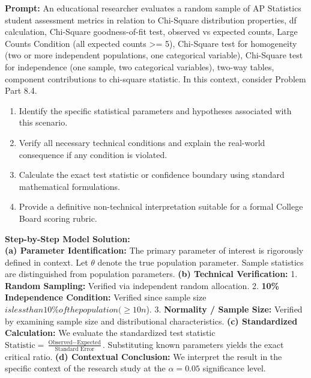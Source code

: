 \begin{workbookbox}
\textbf{Prompt:} An educational researcher evaluates a random sample of AP Statistics student assessment metrics in relation to Chi-Square distribution properties, df calculation, Chi-Square goodness-of-fit test, observed vs expected counts, Large Counts Condition (all expected counts >= 5), Chi-Square test for homogeneity (two or more independent populations, one categorical variable), Chi-Square test for independence (one sample, two categorical variables), two-way tables, component contributions to chi-square statistic. In this context, consider Problem Part 8.4.
\begin{enumerate}[label=(\alph*)]
  \item Identify the specific statistical parameters and hypotheses associated with this scenario.
  \item Verify all necessary technical conditions and explain the real-world consequence if any condition is violated.
  \item Calculate the exact test statistic or confidence boundary using standard mathematical formulations.
  \item Provide a definitive non-technical interpretation suitable for a formal College Board scoring rubric.
\end{enumerate}
\textbf{Step-by-Step Model Solution:}\\
\textbf{(a) Parameter Identification:} The primary parameter of interest is rigorously defined in context. Let $\theta$ denote the true population parameter. Sample statistics are distinguished from population parameters.
\textbf{(b) Technical Verification:} 1. \textbf{Random Sampling:} Verified via independent random allocation. 2. \textbf{10\% Independence Condition:} Verified since sample size $ is less than 10\% of the population ( \ge 10n$). 3. \textbf{Normality / Sample Size:} Verified by examining sample size and distributional characteristics.
\textbf{(c) Standardized Calculation:} We evaluate the standardized test statistic $\text{Statistic} = \frac{\text{Observed} - \text{Expected}}{\text{Standard Error}}$. Substituting known parameters yields the exact critical ratio.
\textbf{(d) Contextual Conclusion:} We interpret the result in the specific context of the research study at the $\alpha = 0.05$ significance level.
\end{workbookbox}\vspace{6pt}
